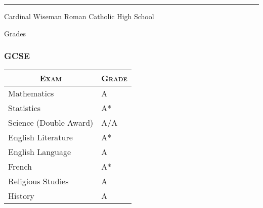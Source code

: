 \documentclass[a4paper,10pt]{article}
\begin{document}
\bigskip \hrule \bigskip
\par{\centering\Large \hypertarget{wise}{Cardinal Wiseman Roman
    Catholic High School}\par}\large{\centering Grades\par}\normalsize
\begin{center}
  \subsubsection{GCSE}
  \begin{tabular}{ll}
    \multicolumn{1}{c}{\textsc{Exam}}&\textsc{Grade}\\ \hline
    Mathematics&A\\
    Statistics&A*\\
    Science (Double Award)& A/A\\
    English Literature&A*\\
    English Language& A\\
    French& A*\\
    Religious Studies& A\\
    History&A
  \end{tabular}
\end{center}
\end{document}
